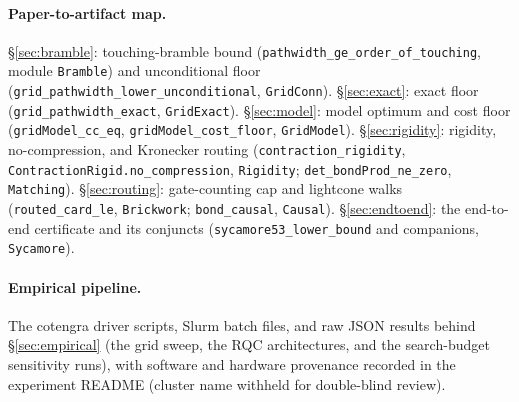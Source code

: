 \documentclass[sigplan,10pt,screen,review,anonymous]{acmart}
\begin{document}
\paragraph{Paper-to-artifact map.} \S\ref{sec:bramble}: touching-bramble bound
(\lstinline|pathwidth_ge_order_of_touching|, module \texttt{Bramble}) and
unconditional floor (\lstinline|grid_pathwidth_lower_unconditional|,
\texttt{GridConn}). \S\ref{sec:exact}: exact floor
(\lstinline|grid_pathwidth_exact|, \texttt{GridExact}). \S\ref{sec:model}:
model optimum and cost floor (\lstinline|gridModel_cc_eq|,
\lstinline|gridModel_cost_floor|, \texttt{GridModel}). \S\ref{sec:rigidity}:
rigidity, no-compression, and Kronecker routing
(\lstinline|contraction_rigidity|, \lstinline|ContractionRigid.no_compression|,
\texttt{Rigidity}; \lstinline|det_bondProd_ne_zero|, \texttt{Matching}).
\S\ref{sec:routing}: gate-counting cap and lightcone walks
(\lstinline|routed_card_le|, \texttt{Brickwork}; \lstinline|bond_causal|,
\texttt{Causal}). \S\ref{sec:endtoend}: the end-to-end certificate and its
conjuncts (\lstinline|sycamore53_lower_bound| and companions,
\texttt{Sycamore}).

\paragraph{Empirical pipeline.} The cotengra driver scripts, Slurm batch files,
and raw JSON results behind \S\ref{sec:empirical} (the grid sweep, the RQC
architectures, and the search-budget sensitivity runs), with software and
hardware provenance recorded in the experiment README (cluster name withheld
for double-blind review).
\end{document}
